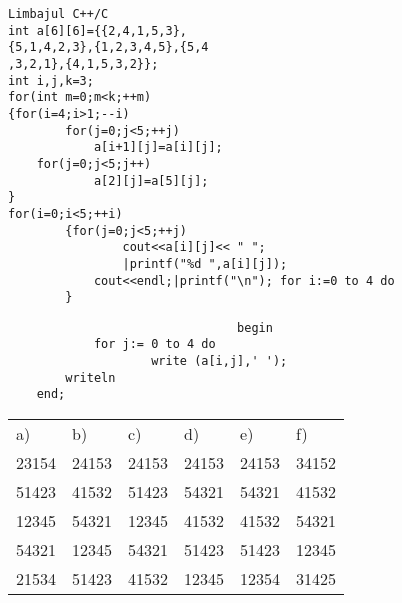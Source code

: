 \begin{verbatim}
Limbajul C++/C
int a[6][6]={{2,4,1,5,3},
{5,1,4,2,3},{1,2,3,4,5},{5,4
,3,2,1},{4,1,5,3,2}};
int i,j,k=3;
for(int m=0;m<k;++m)
{for(i=4;i>1;--i)
        for(j=0;j<5;++j)
            a[i+1][j]=a[i][j];
    for(j=0;j<5;j++)
            a[2][j]=a[5][j];
}
for(i=0;i<5;++i)
        {for(j=0;j<5;++j)
                cout<<a[i][j]<< " ";
                |printf("%d ",a[i][j]);
            cout<<endl;|printf("\n"); for i:=0 to 4 do
        }
\end{verbatim}

\begin{verbatim}
                                begin
            for j:= 0 to 4 do
                    write (a[i,j],' ');
        writeln
    end;
\end{verbatim}

\begin{center}
\begin{tabular}{llllll}
a) & b) & c) & d) & e) & f) \\
23154 & 24153 & 24153 & 24153 & 24153 & 34152 \\
51423 & 41532 & 51423 & 54321 & 54321 & 41532 \\
12345 & 54321 & 12345 & 41532 & 41532 & 54321 \\
54321 & 12345 & 54321 & 51423 & 51423 & 12345 \\
21534 & 51423 & 41532 & 12345 & 12354 & 31425 \\
\end{tabular}
\end{center}

